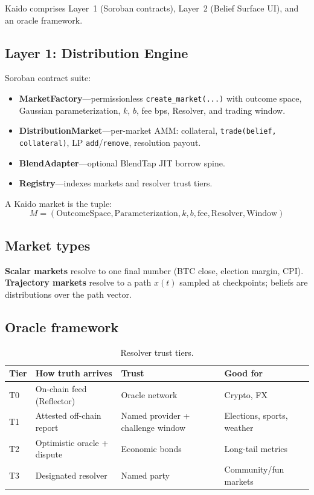 \documentclass{portalciencia}
\begin{document}
Kaido comprises Layer~1 (Soroban contracts), Layer~2 (Belief Surface UI), and an oracle framework.

\subsection{Layer 1: Distribution Engine}

Soroban contract suite:
\begin{itemize}
  \item \textbf{MarketFactory}---permissionless \texttt{create\_market(...)} with outcome space, Gaussian parameterization, $k$, $b$, fee bps, Resolver, and trading window.
  \item \textbf{DistributionMarket}---per-market AMM: collateral, \texttt{trade(belief, collateral)}, LP \texttt{add}/\texttt{remove}, resolution payout.
  \item \textbf{BlendAdapter}---optional BlendTap JIT borrow spine.
  \item \textbf{Registry}---indexes markets and resolver trust tiers.
\end{itemize}

A Kaido market is the tuple:
\begin{equation}
\label{eq:market-tuple}
M = (\text{OutcomeSpace}, \text{Parameterization}, k, b, \text{fee}, \text{Resolver}, \text{Window})
\end{equation}

\subsection{Market types}

\textbf{Scalar markets} resolve to one final number (BTC close, election margin, CPI). \textbf{Trajectory markets} resolve to a path $x(t)$ sampled at checkpoints; beliefs are distributions over the path vector.

\subsection{Oracle framework}

\begin{table}[ht]
\centering
\caption{Resolver trust tiers.}
\label{tab:oracle}
\begin{tabular}{llll}
\toprule
Tier & How truth arrives & Trust & Good for \\
\midrule
T0 & On-chain feed (Reflector) & Oracle network & Crypto, FX \\
T1 & Attested off-chain report & Named provider + challenge window & Elections, sports, weather \\
T2 & Optimistic oracle + dispute & Economic bonds & Long-tail metrics \\
T3 & Designated resolver & Named party & Community/fun markets \\
\bottomrule
\end{tabular}
\end{table}
\end{document}
